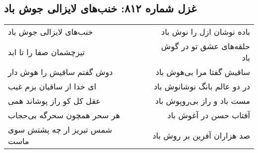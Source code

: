 \begin{center}
\section*{غزل شماره ۸۱۲: خنب‌های لایزالی جوش باد}
\label{sec:0812}
\begin{longtable}{l p{0.5cm} r}
خنب‌های لایزالی جوش باد
&&
باده نوشان ازل را نوش باد
\\
تیزچشمان صفا را تا ابد
&&
حلقه‌های عشق تو در گوش باد
\\
دوش گفتم ساقیش را هوش دار
&&
ساقیش گفتا مرا بی‌هوش باد
\\
ای خدا از ساقیان بزم غیب
&&
در دو عالم بانگ نوشانوش باد
\\
عقل کل کو راز پوشاند همی
&&
مست باد و راز بی‌روپوش باد
\\
هر سحر همچون سحرگه بی‌حجاب
&&
آفتاب حسن در آغوش باد
\\
شمس تبریز ار چه پشتش سوی ماست
&&
صد هزاران آفرین بر روش باد
\\
\end{longtable}
\end{center}
